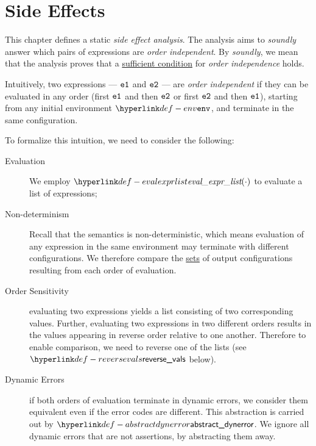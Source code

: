 \chapter{Side Effects\label{chap:SideEffects}}

This chapter defines a static \emph{side effect analysis}.
The analysis aims to \emph{soundly} answer which pairs of expressions are \emph{order independent}.
By \emph{soundly}, we mean that the analysis proves that a \underline{sufficient condition}
for \emph{order independence} holds.

Intuitively, two expressions --- $\texttt{e1}$ and $\texttt{e2}$ --- are \emph{order independent}
if they can be evaluated in any order (first $\texttt{e1}$ and then $\texttt{e2}$ or first $\texttt{e2}$ and then $\texttt{e1}$),
starting from any initial environment $\env$,
and terminate in the same configuration.

To formalize this intuition, we need to consider the following:
\begin{description}
    \item[Evaluation] We employ $\evalexprlist{\cdot}$ to evaluate a list of expressions;

    \item[Non-determinism] Recall that the semantics is non-deterministic, which means evaluation of any
    expression in the same environment may terminate with different configurations. We therefore compare
    the \underline{sets} of output configurations resulting from each order of evaluation.

    \item[Order Sensitivity] evaluating two expressions yields a list consisting of two
    corresponding values. Further, evaluating two expressions in two different orders results in the values
    appearing in reverse order relative to one another. Therefore to enable comparison, we need to reverse one of
    the lists (see $\reversevals$ below).

    \item[Dynamic Errors] if both orders of evaluation terminate in dynamic errors, we consider them
    equivalent even if the error codes are different. This abstraction is carried out by $\abstractdynerror$.
    We ignore all dynamic errors that are not assertions, by abstracting them away.
\end{description}

